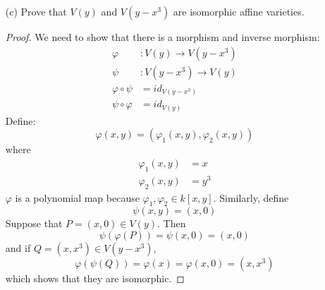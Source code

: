 \documentclass{article}
\begin{document}
\begin{itemize}
        \item [(c)] Prove that $V(y)$ and $V(y - x^{3})$ are isomorphic affine varieties.
            \begin{proof}
                We need to show that there is a morphism and inverse morphism:
                    \begin{align*}
                        \varphi &: V(y) \rightarrow V(y - x^{3}) \\
                        \psi    &: V(y - x^{3}) \rightarrow V(y) \\
                        \varphi \circ \psi &= id_{V(y - x^{3})} \\
                        \psi \circ \varphi &= id_{V(y)}
                    \end{align*}
                Define:
                    \begin{equation*}
                        \varphi( x, y) = (\varphi_{ 1}(x, y), \varphi_{ 2}(x, y))
                    \end{equation*}
                where
                    \begin{align*}
                        \varphi_{ 1}(x, y) &= x \\
                        \varphi_{ 2}(x, y) &= y^{3}
                    \end{align*}
                $\varphi $ is a polynomial map because $\varphi_{ 1}, \varphi_{ 2} \in k[ x, y]$. Similarly, define
                    \begin{equation*}
                        \psi (x, y) = (x, 0)
                    \end{equation*}
                Suppose that $P = (x, 0) \in V( y)$. Then
                    \begin{equation*}
                        \psi  ( \varphi ( P)) = \psi ( x, 0) = (x, 0)
                    \end{equation*}
                and if $Q = (x, x^{3}) \in V( y - x^{3})$,
                    \begin{equation*}
                        \varphi ( \psi ( Q)) = \varphi ( x) = \varphi ( x, 0) = (x, x^{3})
                    \end{equation*}
                which shows that they are isomorphic.
            \end{proof}


\end{itemize}
\end{document}
